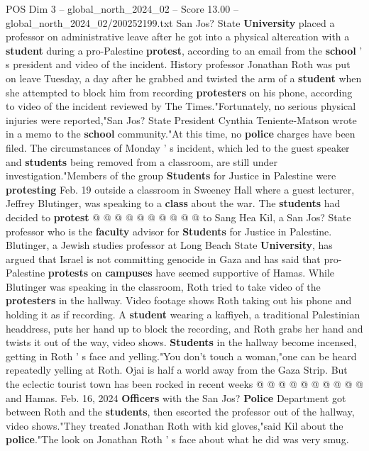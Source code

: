 \begin{textsample}{POS Dim 3 – global\_north\_2024\_02 – Score 13.00 – global\_north\_2024\_02/200252199.txt}  \label{ex:f3_pos_251}
San Jos?
State \textbf{University} placed a professor on administrative leave after he got into a physical altercation with a \textbf{student} during a pro-Palestine \textbf{protest}, according to an email from the \textbf{school} ' s president and video of the incident.
History professor Jonathan Roth was put on leave Tuesday, a day after he grabbed and twisted the arm of a \textbf{student} when she attempted to block him from recording \textbf{protesters} on his phone, according to video of the incident reviewed by The Times."Fortunately, no serious physical injuries were reported,"San Jos?
State President Cynthia Teniente-Matson wrote in a memo to the \textbf{school} community."At this time, no \textbf{police} charges have been filed.
The circumstances of Monday ' s incident, which led to the guest speaker and \textbf{students} being removed from a classroom, are still under investigation."Members of the group \textbf{Students} for Justice in Palestine were \textbf{protesting} Feb. 19 outside a classroom in Sweeney Hall where a guest lecturer, Jeffrey Blutinger, was speaking to a \textbf{class} about the war.
The \textbf{students} had decided to \textbf{protest} @ @ @ @ @ @ @ @ @ @ to Sang Hea Kil, a San Jos?
State professor who is the \textbf{faculty} advisor for \textbf{Students} for Justice in Palestine.
Blutinger, a Jewish studies professor at Long Beach State \textbf{University}, has argued that Israel is not committing genocide in Gaza and has said that pro-Palestine \textbf{protests} on \textbf{campuses} have seemed supportive of Hamas.
While Blutinger was speaking in the classroom, Roth tried to take video of the \textbf{protesters} in the hallway.
Video footage shows Roth taking out his phone and holding it as if recording.
A \textbf{student} wearing a kaffiyeh, a traditional Palestinian headdress, puts her hand up to block the recording, and Roth grabs her hand and twists it out of the way, video shows. \textbf{Students} in the hallway become incensed, getting in Roth ' s face and yelling."You don't touch a woman,"one can be heard repeatedly yelling at Roth.
Ojai is half a world away from the Gaza Strip.
But the eclectic tourist town has been rocked in recent weeks @ @ @ @ @ @ @ @ @ @ and Hamas.
Feb. 16, 2024 \textbf{Officers} with the San Jos? \textbf{Police} Department got between Roth and the \textbf{students}, then escorted the professor out of the hallway, video shows."They treated Jonathan Roth with kid gloves,"said Kil about the \textbf{police}."The look on Jonathan Roth ' s face about what he did was very smug.

\end{textsample}
